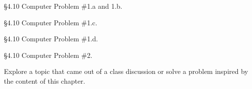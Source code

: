 \begin{problem} [15 points]
\S 4.10 Computer Problem \#1.a and 1.b.
\end{problem}

\begin{problem} [10 points]
\S 4.10 Computer Problem \#1.c.
\end{problem}

\begin{problem} [10 points]
\S 4.10 Computer Problem \#1.d.
\end{problem}

\begin{problem} [10 points]
\S 4.10 Computer Problem \#2.
\end{problem}

\begin{problem} [10 points]
Explore a topic that came out of a class discussion or solve a problem inspired by the content of this chapter.
\end{problem}
